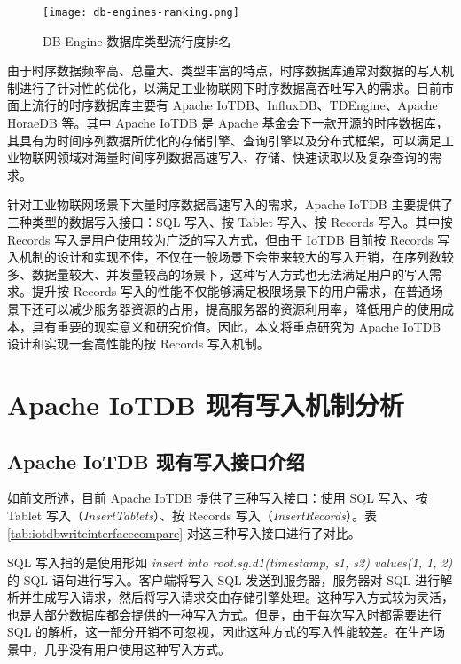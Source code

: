 \begin{figure}
  \centering
  \texttt{[image: db-engines-ranking.png]}
  \caption{DB-Engine 数据库类型流行度排名}
  \label{fig:db-engine}
\end{figure}

由于时序数据频率高、总量大、类型丰富的特点，时序数据库通常对数据的写入机制进行了针对性的优化，以满足工业物联网下时序数据高吞吐写入的需求。目前市面上流行的时序数据库主要有 Apache IoTDB\cite{wang2023apache}、InfluxDB\cite{naqvi2017time}、TDEngine\cite{tdengine2024github}、Apache HoraeDB\cite{apache2024horaedb} 等。其中 Apache IoTDB 是 Apache 基金会下一款开源的时序数据库，其具有为时间序列数据所优化的存储引擎、查询引擎以及分布式框架，可以满足工业物联网领域对海量时间序列数据高速写入、存储、快速读取以及复杂查询的需求\cite{wang2020apache}。

针对工业物联网场景下大量时序数据高速写入的需求，Apache IoTDB 主要提供了三种类型的数据写入接口：SQL 写入、按 Tablet 写入、按 Records 写入\cite{iotdb2024writedeletedata}。其中按 Records 写入是用户使用较为广泛的写入方式，但由于 IoTDB 目前按 Records 写入机制的设计和实现不佳，不仅在一般场景下会带来较大的写入开销，在序列数较多、数据量较大、并发量较高的场景下，这种写入方式也无法满足用户的写入需求。提升按 Records 写入的性能不仅能够满足极限场景下的用户需求，在普通场景下还可以减少服务器资源的占用，提高服务器的资源利用率，降低用户的使用成本，具有重要的现实意义和研究价值。因此，本文将重点研究为 Apache IoTDB 设计和实现一套高性能的按 Records 写入机制。
\section{Apache IoTDB 现有写入机制分析\label{sec:chap1-sec2}}
\subsection{Apache IoTDB 现有写入接口介绍}
如前文所述，目前 Apache IoTDB 提供了三种写入接口：使用 SQL 写入、按 Tablet 写入（\emph{InsertTablets}）、按 Records 写入（\emph{InsertRecords}）。表 \ref{tab:iotdbwriteinterfacecompare} 对这三种写入接口进行了对比。

SQL 写入指的是使用形如 \emph{insert into root.sg.d1(timestamp, s1, s2) values(1, 1, 2)} 的 SQL 语句进行写入。客户端将写入 SQL 发送到服务器，服务器对 SQL 进行解析并生成写入请求，然后将写入请求交由存储引擎处理。这种写入方式较为灵活，也是大部分数据库都会提供的一种写入方式。但是，由于每次写入时都需要进行 SQL 的解析，这一部分开销不可忽视，因此这种方式的写入性能较差。在生产场景中，几乎没有用户使用这种写入方式。

